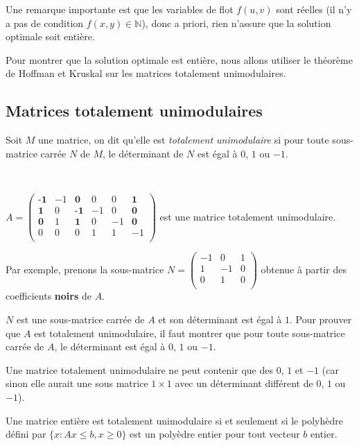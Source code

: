 \documentclass[a4paper]{article}
\begin{document}
\begin{remark}
	Une remarque importante est que les variables de flot $f(u, v)$ sont réelles (il n'y a pas de condition $f(x,y)\in \mathbb{N}$), donc a priori, rien n'assure que la solution optimale soit entière.
\end{remark}

Pour montrer que la solution optimale est entière, nous allons utiliser le théorème de Hoffman et Kruskal sur les matrices totalement unimodulaires.
\subsection{Matrices totalement unimodulaires}
\begin{definition}
Soit $M$ une matrice, on dit qu'elle est \emph{totalement unimodulaire} si pour toute sous-matrice carrée $N$ de $M$, le déterminant de $N$ est égal à $0$, $1$ ou $-1$.
\end{definition}
\begin{eg}\,

	$A = \begin{pmatrix}
	\textbf{-1} & -1 & \textbf{0} & 0 & 0 & \textbf{1} \\
	\textbf{1} & 0 & \textbf{-1} & -1 & 0 & \textbf{0} \\
	\textbf{0} & 1 & \textbf{1} & 0 & -1 & \textbf{0} \\
	0 & 0 & 0 & 1 & 1 & -1 \\
	\end{pmatrix}$ est une matrice totalement unimodulaire.

	Par exemple, prenons la sous-matrice $N = \begin{pmatrix}
	-1 & 0 & 1 \\
	1 & -1 & 0 \\
	0 & 1 & 0 \\
	\end{pmatrix}$ obtenue à partir des coefficients \textbf{noirs} de $A$.

	$N$ est une sous-matrice carrée de $A$ et son déterminant est égal à $1$. Pour prouver que $A$ est totalement unimodulaire, il faut montrer que pour toute sous-matrice carrée de $A$, le déterminant est égal à $0$, $1$ ou $-1$.
\end{eg}
\begin{remark}
	Une matrice totalement unimodulaire ne peut contenir que des $0$, $1$ et $-1$ (car sinon elle aurait une sous matrice $1\times 1$ avec un déterminant différent de $0$, $1$ ou $-1$).
\end{remark}
\begin{theorem}
Une matrice entière est totalement unimodulaire si et seulement si le polyhèdre défini par $\{x : Ax \leq b, x \geq 0\}$ est un polyèdre entier pour tout vecteur $b$ entier.
\end{theorem}
\end{document}
